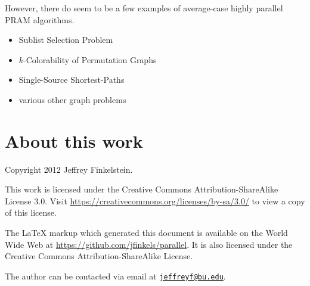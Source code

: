 \documentclass{article}
\newcommand{\email}[1]{\href{mailto:#1}{\nolinkurl{#1}}}
\begin{document}
However, there do seem to be a few examples of average-case highly parallel PRAM algorithms.
\begin{itemize}
\item Sublist Selection Problem \cite{pz91}
\item $k$-Colorability of Permutation Graphs \cite{an99}
\item Single-Source Shortest-Paths \cite{meyer02}
\item various other graph problems \cite{rs92}
\end{itemize}

\section{About this work}

Copyright 2012 Jef{}frey Finkelstein.

This work is licensed under the Creative Commons Attribution-ShareAlike License 3.0.
Visit \mbox{\url{https://creativecommons.org/licenses/by-sa/3.0/}} to view a copy of this license.

The \LaTeX{} markup which generated this document is available on the World Wide Web at \mbox{\url{https://github.com/jfinkels/parallel}}.
It is also licensed under the Creative Commons Attribution-ShareAlike License.

The author can be contacted via email at \email{jeffreyf@bu.edu}.



\end{document}
